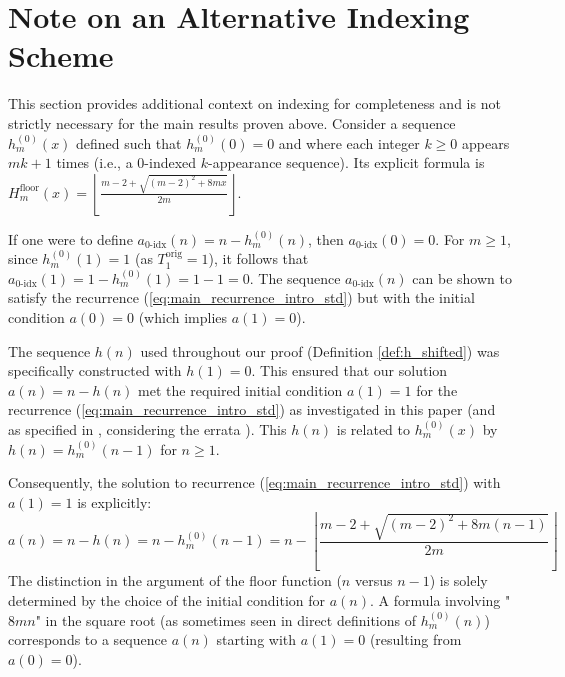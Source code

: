 \documentclass[11pt,a4paper]{article} %
\theoremstyle{remark}
\newcommand{\floor}[1]{\left\lfloor #1 \right\rfloor} %
\begin{document}
\section{Note on an Alternative Indexing Scheme} \label{sec:alt_indexing_remarks}
This section provides additional context on indexing for completeness and is not strictly necessary for the main results proven above.
Consider a sequence $h_m^{(0)}(x)$ defined such that $h_m^{(0)}(0)=0$ and where each integer $k \ge 0$ appears $mk+1$ times (i.e., a 0-indexed $k$-appearance sequence). Its explicit formula is $H_m^{\text{floor}}(x) = \floor{\frac{m-2+\sqrt{(m-2)^2+8mx}}{2m}}$.

If one were to define $a_{\text{0-idx}}(n) = n - h_m^{(0)}(n)$, then $a_{\text{0-idx}}(0)=0$. For $m \ge 1$, since $h_m^{(0)}(1)=1$ (as $T_1^{\text{orig}}=1$), it follows that $a_{\text{0-idx}}(1)=1-h_m^{(0)}(1)=1-1=0$.
The sequence $a_{\text{0-idx}}(n)$ can be shown to satisfy the recurrence (\ref{eq:main_recurrence_intro_std}) but with the initial condition $a(0)=0$ (which implies $a(1)=0$).

The sequence $h(n)$ used throughout our proof (Definition \ref{def:h_shifted}) was specifically constructed with $h(1)=0$. This ensured that our solution $a(n)=n-h(n)$ met the required initial condition $a(1)=1$ for the recurrence (\ref{eq:main_recurrence_intro_std}) as investigated in this paper (and as specified in \cite{Iannucci1999}, considering the errata \cite{Iannucci1999errata}). This $h(n)$ is related to $h_m^{(0)}(x)$ by $h(n) = h_m^{(0)}(n-1)$ for $n \ge 1$.

Consequently, the solution to recurrence (\ref{eq:main_recurrence_intro_std}) with $a(1)=1$ is explicitly:
$$a(n) = n - h(n) = n - h_m^{(0)}(n-1) = n - \floor{\frac{m-2+\sqrt{(m-2)^2+8m(n-1)}}{2m}}$$
The distinction in the argument of the floor function ($n$ versus $n-1$) is solely determined by the choice of the initial condition for $a(n)$. A formula involving "$8mn$" in the square root (as sometimes seen in direct definitions of $h_m^{(0)}(n)$) corresponds to a sequence $a(n)$ starting with $a(1)=0$ (resulting from $a(0)=0$).
\end{document}
